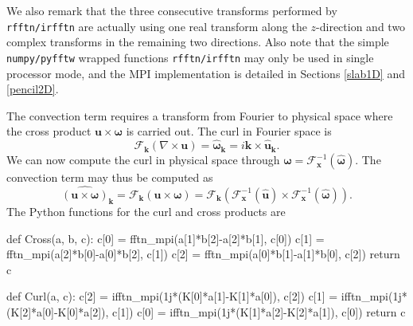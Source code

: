 \documentclass[11pt, oneside]{article}
\newcommand{\inpyth}{\lstinline[style=pythonstyle, basicstyle=\ttfamily]} %[]%
\begin{document}
We also remark that the three consecutive transforms performed by \inpyth{rfftn/irfftn} are actually using one real transform along the $z$-direction and two complex transforms in the remaining two directions. Also note that the simple \texttt{numpy/pyfftw} wrapped functions \inpyth{rfftn/irfftn} may only be used in single processor mode, and the MPI implementation is detailed in Sections
\ref{slab1D} and \ref{pencil2D}.

The convection term requires a transform from Fourier to physical space where the cross product $\bm{u} \times \bm{\omega}$ is carried out. The curl in Fourier space is
\begin{equation}
\mathcal{F}_{\bm{k}}(\nabla \times \bm{u}) = \hat{\bm{\omega}}_{\bm{k}} = i \bm{k} \times \hat{\bm{u}}_{\bm{k}}.
\end{equation}
We can now compute the curl in physical space through $\bm{\omega} = \mathcal{F}_{\bm{x}}^{-1}(\hat{\bm{\omega}})$. The convection term may thus be computed as
\begin{equation}
\widehat{( \bm{u} \times \bm{\omega})}_{\bm{k}} = \mathcal{F}_{\bm{k}}(\bm{u} \times \bm{\omega}) = \mathcal{F}_{\bm{k}} (\mathcal{F}^{-1}_{\bm{x}}(\hat{\bm{u}}) \times \mathcal{F}^{-1}_{\bm{x}}(\hat{\bm{\omega}})).
\label{eq:curl_convection}
\end{equation}
The Python functions for the curl and cross products are

\begin{python}
def Cross(a, b, c):
    c[0] = fftn_mpi(a[1]*b[2]-a[2]*b[1], c[0])
    c[1] = fftn_mpi(a[2]*b[0]-a[0]*b[2], c[1])
    c[2] = fftn_mpi(a[0]*b[1]-a[1]*b[0], c[2])
    return c

def Curl(a, c):
    c[2] = ifftn_mpi(1j*(K[0]*a[1]-K[1]*a[0]), c[2])
    c[1] = ifftn_mpi(1j*(K[2]*a[0]-K[0]*a[2]), c[1])
    c[0] = ifftn_mpi(1j*(K[1]*a[2]-K[2]*a[1]), c[0])
    return c
\end{python}
\end{document}
